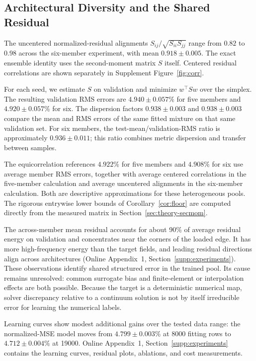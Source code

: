 \documentclass[twoside,11pt]{article}
\newcommand{\predRMSSix}{4.920}      %
\newcommand{\predRMSSixSd}{0.057}
\newcommand{\dispFacSix}{0.938}      %
\newcommand{\dispFacSixSd}{0.003}
\newcommand{\corrBarSix}{0.918}      %
\newcommand{\corrBarSixSd}{0.005}
\newcommand{\corrNetLoSix}{0.82}     %
\newcommand{\corrNetHiSix}{0.98}
\newcommand{\ensFloorSix}{4.908}     %
\newcommand{\lcMlpEightK}{4.799}\newcommand{\lcMlpEightKSd}{0.003}
\newcommand{\lcMlpNineteenK}{4.712}\newcommand{\lcMlpNineteenKSd}{0.004}
\newcommand{\predRMS}{4.940}         %
\newcommand{\predRMSSd}{0.057}
\newcommand{\dispFac}{0.938}         %
\newcommand{\dispFacSd}{0.003}
\newcommand{\ensFloor}{4.922}        %
\begin{document}
\subsection{Architectural Diversity and the Shared Residual}
\label{sec:diversity}
The uncentered normalized-residual alignments
$S_{ij}/\sqrt{S_{ii}S_{jj}}$ range from $\corrNetLoSix$ to
$\corrNetHiSix$ across the six-member experiment, with mean
$\corrBarSix\pm\corrBarSixSd$. The exact ensemble identity uses the
second-moment matrix $S$ itself. Centered residual correlations are shown
separately in Supplement Figure~\ref{fig:corr}.

For each seed, we estimate $S$ on validation and minimize $w^\top Sw$ over the simplex. The resulting validation RMS errors are $\predRMS\pm\predRMSSd\%$ for five members and $\predRMSSix\pm\predRMSSixSd\%$ for six. The dispersion factors $\dispFac\pm\dispFacSd$ and $\dispFacSix\pm\dispFacSixSd$ compare the mean and RMS errors of the same fitted mixture on that same validation set. For six members, the test-mean/validation-RMS ratio is approximately $0.936\pm0.011$; this ratio combines metric dispersion and transfer between samples.

The equicorrelation references $\ensFloor\%$ for five members and
$\ensFloorSix\%$ for six use average member RMS errors, together with
average centered correlations in the five-member calculation and average
uncentered alignments in the six-member calculation. Both are descriptive
approximations for these heterogeneous pools. The rigorous entrywise lower
bounds of Corollary~\ref{cor:floor} are computed directly from the measured
matrix in Section~\ref{sec:theory-secmom}.

The across-member mean residual accounts for about 90\% of average residual energy on validation and concentrates near the corners of the loaded edge. It has more high-frequency energy than the target fields, and leading residual directions align across architectures (Online Appendix~1, Section~\ref{supp:experiments}). These observations identify shared structured error in the trained pool. Its cause remains unresolved: common surrogate bias and finite-element or interpolation effects are both possible. Because the target is a deterministic numerical map, solver discrepancy relative to a continuum solution is not by itself irreducible error for learning the numerical labels.

Learning curves show modest additional gains over the tested data range: the normalized-MSE model moves from $\lcMlpEightK\pm\lcMlpEightKSd\%$ at 8000 fitting rows to $\lcMlpNineteenK\pm\lcMlpNineteenKSd\%$ at 19000. Online Appendix~1, Section~\ref{supp:experiments} contains the learning curves, residual plots, ablations, and cost measurements.
\end{document}
